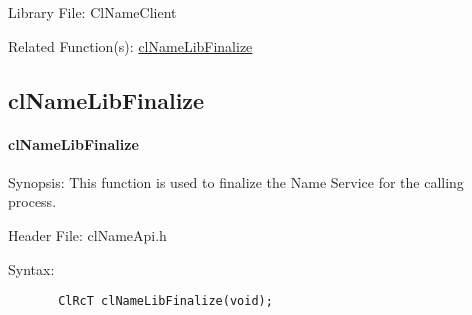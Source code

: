 \begin{flushleft}
\begin{Desc}
\end{Desc}
\begin{Desc}
\item[Library File:]Cl\-Name\-Client\end{Desc}
\begin{Desc}
\item[Related Function(s):]\hyperlink{pagens102}{cl\-Name\-Lib\-Finalize} \end{Desc}
\newpage


\subsection{clNameLibFinalize}
\hypertarget{pagens102}{}\paragraph{cl\-Name\-Lib\-Finalize}\label{pagens102}
\begin{Desc}
\item[Synopsis:]This function is used to finalize the Name Service for the calling process.\end{Desc}
\begin{Desc}
\item[Header File:]clNameApi.h\end{Desc}
\begin{Desc}
\item[Syntax:]

\footnotesize\begin{verbatim}       ClRcT clNameLibFinalize(void);


\end{verbatim}
\end{Desc}
\end{flushleft}
